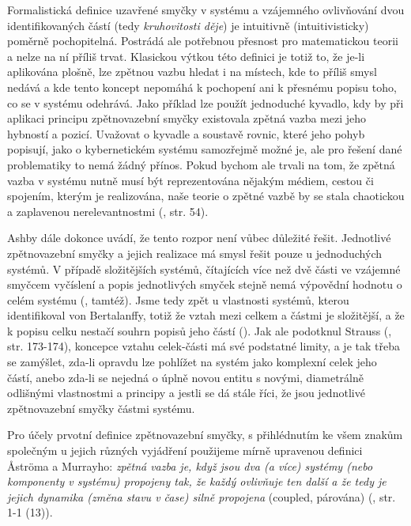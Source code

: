 \documentclass[11pt,a4paper]{article}
\begin{document}
Formalistická definice uzavřené smyčky v systému a vzájemného ovlivňování dvou identifikovaných částí (tedy \textit{kruhovitosti děje}) je intuitivně (intuitivisticky) poměrně pochopitelná. Postrádá ale potřebnou přesnost pro matematickou teorii a nelze na ní příliš trvat. Klasickou výtkou této definici je totiž to, že je-li aplikována plošně, lze zpětnou vazbu hledat i na místech, kde to příliš smysl nedává a kde tento koncept nepomáhá k pochopení ani k přesnému popisu toho, co se v systému odehrává. Jako příklad lze použít jednoduché kyvadlo, kdy by při aplikaci principu zpětnovazební smyčky existovala zpětná vazba mezi jeho hybností a pozicí. Uvažovat o kyvadle a soustavě rovnic, které jeho pohyb popisují, jako o kybernetickém systému samozřejmě možné je, ale pro řešení dané problematiky to nemá žádný přínos. Pokud bychom ale trvali na tom, že zpětná vazba v systému nutně musí být reprezentována nějakým médiem, cestou či spojením, kterým je realizována, naše teorie o zpětné vazbě by se stala chaotickou a zaplavenou nerelevantnostmi (\cite{ashby_introduction_2015}, str. 54). 

Ashby dále dokonce uvádí, že tento rozpor není vůbec důležité řešit. Jednotlivé zpětnovazební smyčky a jejich realizace má smysl řešit pouze u jednoduchých systémů. V případě složitějších systémů, čítajících více než dvě části ve vzájemné smyčcem vyčíslení a popis jednotlivých smyček stejně nemá výpovědní hodnotu o celém systému (\cite*{ashby_introduction_2015}, tamtéž). Jsme tedy zpět u vlastnosti systémů, kterou identifikoval von Bertalanffy, totiž že vztah mezi celkem a částmi je složitější, a že k popisu celku nestačí souhrn popisů jeho částí (\cite*{von_bertalanffy_outline_1950}). Jak ale podotknul Strauss (\cite*{strauss_scope_2002}, str. 173-174), koncepce vztahu celek-části má své podstatné limity, a je tak třeba se zamýšlet, zda-li opravdu lze pohlížet na systém jako komplexní celek jeho částí, anebo zda-li se nejedná o úplně novou entitu s novými, diametrálně odlišnými vlastnostmi a principy a jestli se dá stále říci, že jsou jednotlivé zpětnovazební smyčky částmi systému.

Pro účely prvotní definice zpětnovazební smyčky, s přihlédnutím ke všem znakům společným u jejich různých vyjádření použijeme mírně upravenou definici Åströma a Murrayho: \textit{zpětná vazba je, když jsou dva (a více) systémy (nebo komponenty v systému) propojeny tak, že každý ovlivňuje ten další a že tedy je jejich dynamika (změna stavu v čase) silně propojena} (coupled, párována) (\cite*{astrom_feedback_2021}, str. 1-1 (13)).
\end{document}
